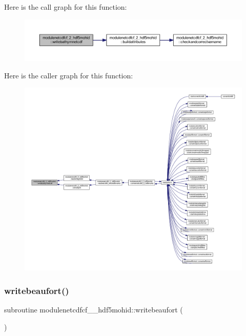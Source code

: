 Here is the call graph for this function\+:\nopagebreak
\begin{figure}[H]
\begin{center}
\leavevmode
\includegraphics[width=350pt]{namespacemodulenetcdfcf__2__hdf5mohid_a47fc9c2f9553c656c2bee0e119f10b27_cgraph}
\end{center}
\end{figure}
Here is the caller graph for this function\+:\nopagebreak
\begin{figure}[H]
\begin{center}
\leavevmode
\includegraphics[width=350pt]{namespacemodulenetcdfcf__2__hdf5mohid_a47fc9c2f9553c656c2bee0e119f10b27_icgraph}
\end{center}
\end{figure}
\mbox{\label{namespacemodulenetcdfcf__2__hdf5mohid_ae5e557cc9dcf221c2e0d2768df186417}} 
\subsubsection{\texorpdfstring{writebeaufort()}{writebeaufort()}}
{\footnotesize\ttfamily subroutine modulenetcdfcf\+\_\+\_\+hdf5mohid\+::writebeaufort (\begin{DoxyParamCaption}{ }\end{DoxyParamCaption})\hspace{0.3cm}{\ttfamily [private]}}

